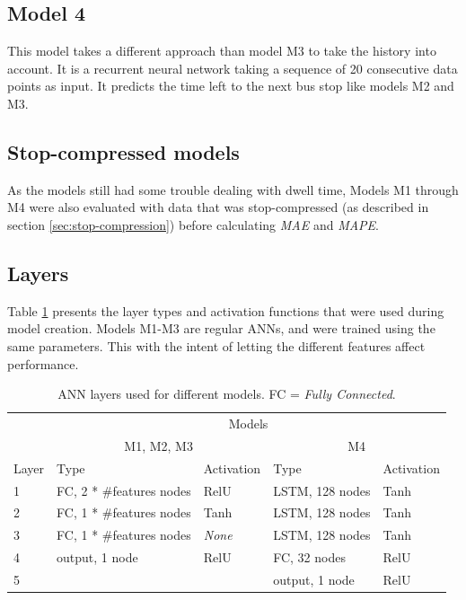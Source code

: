 \subsection{Model 4}
This model takes a different approach than model M3 to take the history into account. It is a recurrent neural network taking a sequence of 20 consecutive data points as input. It predicts the time left to the next bus stop like models M2 and M3. 

\subsection{Stop-compressed models}
As the models still had some trouble dealing with dwell time, Models M1 through M4 were also evaluated with data that was stop-compressed (as described in section \ref{sec:stop-compression}) before calculating \textit{MAE} and \textit{MAPE}. 

\subsection{Layers}
Table \ref{tbl:nn-layers} presents the layer types and activation functions that were used during model creation. Models M1-M3 are regular ANNs, and were trained using the same parameters. This with the intent of letting the different features affect performance.

\begin{table}[h]
  \centering
  \caption{ANN layers used for different models. FC = \textit{Fully Connected}.}
  \label{tbl:nn-layers}
  \begin{tabular}{l|l|l|l|l}
        & \multicolumn{4}{c}{Models}                                                                                           \\ \cline{2-5} 
        & \multicolumn{2}{c|}{M1, M2, M3}                           & \multicolumn{2}{c}{M4}                                   \\ \hline
  Layer & Type                     & Activation                     & Type                     & Activation                     \\ \hline
  1     & FC, 2 * \#features nodes & RelU                           & LSTM, 128 nodes          & Tanh                        \\
  2     & FC, 1 * \#features nodes & Tanh                           & LSTM, 128 nodes          & Tanh                        \\
  3     & FC, 1 * \#features nodes & \textit{None} & LSTM, 128 nodes          & Tanh                        \\
  4     & output, 1 node           & RelU                           & FC, 32 nodes & RelU                           \\
  5     &                          &                                & output, 1 node           & RelU
  \end{tabular}
  \end{table}

